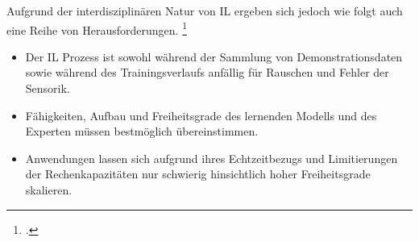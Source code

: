 Aufgrund der interdisziplinären Natur von IL ergeben sich jedoch wie folgt auch eine Reihe von Herausforderungen. \footcite[Vgl.][S. 4f.]{Hussein.2017}
\begin{itemize}
    \item Der IL Prozess ist sowohl während der Sammlung von Demonstrationsdaten sowie während des Trainingsverlaufs anfällig für Rauschen und Fehler der Sensorik.
    \item Fähigkeiten, Aufbau und Freiheitsgrade des lernenden Modells und des Experten müssen bestmöglich übereinstimmen.
    \item Anwendungen lassen sich aufgrund ihres Echtzeitbezugs und Limitierungen der Rechenkapazitäten nur schwierig hinsichtlich hoher Freiheitsgrade skalieren.
\end{itemize}